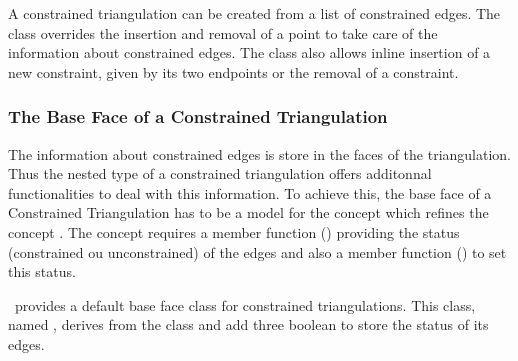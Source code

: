 A  constrained triangulation can be created
from a
list of constrained edges.
The class 
overrides the insertion and removal of a point to take care of the
information about constrained edges. The class also allows inline
insertion of a new constraint, given by its two endpoints
or the removal of a constraint.

\subsubsection{The Base Face of a Constrained Triangulation}
 The information about constrained edges is store in the 
faces of the triangulation. Thus the nested 
type of a constrained triangulation offers
additonnal functionalities to deal with this information.
To achieve this, the base face of a Constrained Triangulation
has to be a model for the concept 
which refines the concept .
The concept 
requires  a member function
()
 providing the status
(constrained ou unconstrained) of the edges
and also a member function 
() to set this status.


\cgal\ provides a default base face class
for constrained triangulations. This class, named
,
derives from the class
and add three boolean to store the status of its edges. 



